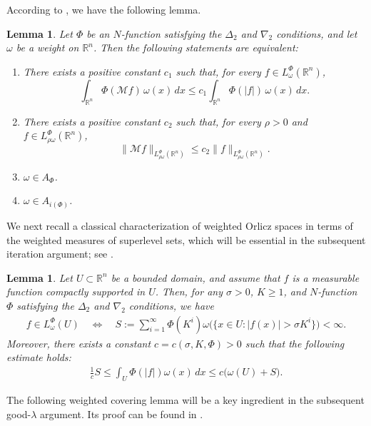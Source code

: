 \documentclass[10pt,a4paper]{article}
\newtheorem{lemma}[theorem]{Lemma}
\theoremstyle{definition}
\numberwithin{equation}{section}
\begin{document}
According to \cite[Theorem 2.1.1]{kk}, we have the following lemma.
\begin{lemma}\label{weight3}
 Let $\Phi$ be an $N$-function satisfying the $\Delta_2$ and $\nabla_2$ conditions, and let $\omega$ be a weight on $\mathbb{R}^n$. Then the following statements are equivalent:
\begin{enumerate}
    \item[(i)] There exists a positive constant \( c_1 \) such that, for every \( f \in L^\Phi_\omega(\mathbb{R}^n) \),
    \[
    \int_{\mathbb{R}^n} \Phi(\mathcal{M}f)\,\omega(x)\,dx \leq c_1 \int_{\mathbb{R}^n} \Phi(|f|)\,\omega(x)\,dx.
    \]

    \item[(ii)] There exists a positive constant \( c_2 \) such that, for every \( \rho > 0 \) and \( f \in L^\Phi_{\rho\omega}(\mathbb{R}^n) \),
    \[
    \|\mathcal{M}f\|_{L^\Phi_{\rho\omega}(\mathbb{R}^n)} \leq c_2 \|f\|_{L^\Phi_{\rho\omega}(\mathbb{R}^n)}.
    \]

    \item[(iii)] \( \omega \in A_\Phi \).

    \item[(iv)] \( \omega \in A_{i(\Phi)} \).
\end{enumerate}
\end{lemma}

We next recall a classical characterization of weighted Orlicz spaces in terms of the weighted measures of superlevel sets, which will be essential in the subsequent iteration argument; see \cite{rr28}.

\begin{lemma}\label{weight4}
Let $U \subset \mathbb{R}^n$ be a bounded domain, and assume that $f$ is a measurable function compactly supported in $U$. Then, for any $\sigma > 0$, $K \geq 1$, and $N$-function $\Phi$ satisfying the $\Delta_2$ and $\nabla_2$ conditions, we have
\begin{align}
	f \in L_{\omega}^{\Phi}(U) \quad \Longleftrightarrow \quad 
	S := \sum_{i=1}^{\infty} \Phi(K^i) \omega\bigl(\{x \in U : |f(x)| > \sigma K^i\}\bigr) < \infty.
\end{align}
Moreover, there exists a constant $c = c(\sigma, K, \Phi) > 0$ such that the following estimate holds:
\begin{align}
	\frac{1}{c}S \leq \int_U \Phi(|f|) \omega(x) \, dx \leq c\bigl(\omega(U) + S\bigr).
\end{align}
\end{lemma}
The following weighted covering lemma will be a key ingredient in the subsequent good-$\lambda$ argument. Its proof can be found in \cite[Lemma 3.8]{mp}. 
 
\end{document}
